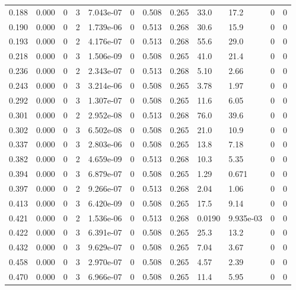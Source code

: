 \documentclass[preview]{standalone}
\begin{document}
{{\begin{tabular}{L{1.2cm}C{1.2cm} C{0.3cm}C{0.5cm} C{1.4cm}C{1.4cm} C{1.4cm}C{1.4cm} C{1.6cm}C{1.6cm} C{1.6cm}C{1.6cm}}
  0.188  &  0.000  & 0     &  3 &  7.043e-07  & 0  &  0.508&   0.265& 33.0 & 17.2   &  0 & 0  \\ 
  0.190  &  0.000  & 0     &  2 &  1.739e-06  & 0  &  0.513&   0.268& 30.6 & 15.9   &  0 & 0  \\ 
  0.193  &  0.000  & 0     &  2 &  4.176e-07  & 0  &  0.513&   0.268& 55.6 & 29.0   &  0 & 0  \\ 
  0.218  &  0.000  & 0     &  3 &  1.506e-09  & 0  &  0.508&   0.265& 41.0 & 21.4   &  0 & 0  \\ 
  0.236  &  0.000  & 0     &  2 &  2.343e-07  & 0  &  0.513&   0.268& 5.10 & 2.66   &  0 & 0  \\ 
  0.243  &  0.000  & 0     &  3 &  3.214e-06  & 0  &  0.508&   0.265& 3.78 & 1.97   &  0 & 0  \\ 
  0.292  &  0.000  & 0     &  3 &  1.307e-07  & 0  &  0.508&   0.265& 11.6 & 6.05   &  0 & 0  \\ 
  0.301  &  0.000  & 0     &  2 &  2.952e-08  & 0  &  0.513&   0.268& 76.0 & 39.6   &  0 & 0  \\ 
  0.302  &  0.000  & 0     &  3 &  6.502e-08  & 0  &  0.508&   0.265& 21.0 & 10.9   &  0 & 0  \\ 
  0.337  &  0.000  & 0     &  3 &  2.803e-06  & 0  &  0.508&   0.265& 13.8 & 7.18   &  0 & 0  \\ 
  0.382  &  0.000  & 0     &  2 &  4.659e-09  & 0  &  0.513&   0.268& 10.3 & 5.35   &  0 & 0  \\ 
  0.394  &  0.000  & 0     &  3 &  6.879e-07  & 0  &  0.508&   0.265& 1.29 & 0.671   &  0 & 0  \\ 
  0.397  &  0.000  & 0     &  2 &  9.266e-07  & 0  &  0.513&   0.268& 2.04 & 1.06   &  0 & 0  \\ 
  0.413  &  0.000  & 0     &  3 &  6.420e-09  & 0  &  0.508&   0.265& 17.5 & 9.14   &  0 & 0  \\ 
  0.421  &  0.000  & 0     &  2 &  1.536e-06  & 0  &  0.513&   0.268& 0.0190 & 9.935e-03   &  0 & 0  \\ 
  0.422  &  0.000  & 0     &  3 &  6.391e-07  & 0  &  0.508&   0.265& 25.3 & 13.2   &  0 & 0  \\ 
  0.432  &  0.000  & 0     &  3 &  9.629e-07  & 0  &  0.508&   0.265& 7.04 & 3.67   &  0 & 0  \\ 
  0.458  &  0.000  & 0     &  3 &  2.970e-07  & 0  &  0.508&   0.265& 4.57 & 2.39   &  0 & 0  \\ 
  0.470  &  0.000  & 0     &  3 &  6.966e-07  & 0  &  0.508&   0.265& 11.4 & 5.95   &  0 & 0  \\ 

\end{tabular}}}
\end{document}
